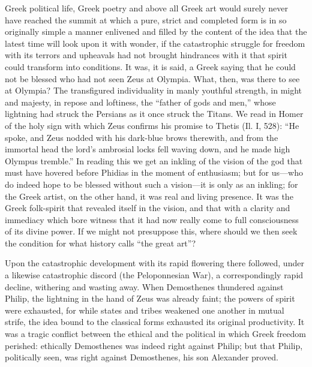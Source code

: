 \documentclass[12pt]{book}
\newcommand{\opage}[1]{\marginnote{\footnotesize\textit{[#1]}}}
\begin{document}
Greek political life, Greek poetry and above all Greek art would surely
never have reached the summit at which a pure, strict and completed form
is in so originally simple a manner enlivened and filled by the content
of the idea that the latest time will look upon it with wonder, if the
catastrophic struggle for freedom with its terrors and upheavals had not
brought hindrances with it that spirit could transform into conditions.
It was, it is said, a Greek saying that he could not be blessed who had
not seen Zeus at Olympia. What, then, was there to see at Olympia? The
transfigured individuality in manly youthful strength, in might and
majesty, in repose and loftiness, the ``father of gods and men,'' whose
lightning had struck the Persians as it once struck the Titans. We read
in Homer of the holy sign with which Zeus confirms his promise to Thetis
(Il. I, 528): ``He spoke, and Zeus nodded with his dark-blue brows
therewith, and from the immortal head the lord's ambrosial locks fell
waving down, and he made high Olympus tremble.'' In reading this we get
an inkling of the vision of the god that must have hovered before
Phidias in the moment of enthusiasm; but for us---who do indeed hope to
be blessed without such a vision---it is only as an inkling; for the
Greek artist, on the other hand, it was real and living presence. It was
the Greek folk-spirit that revealed itself in the vision, and that with
a clarity and immediacy which bore witness that it had now really come
to full consciousness of its divine power. If we might not presuppose
this, where
\opage{27}\setcounter{footnote}{0}%
should we then seek the condition for what history calls ``the great
art''?

Upon the catastrophic development with its rapid flowering there
followed, under a likewise catastrophic discord (the Peloponnesian War),
a correspondingly rapid decline, withering and wasting away. When
Demosthenes thundered against Philip, the lightning in the hand of Zeus
was already faint; the powers of spirit were exhausted, for while states
and tribes weakened one another in mutual strife, the idea bound to the
classical forms exhausted its original productivity. It was a tragic
conflict between the ethical and the political in which Greek freedom
perished: ethically Demosthenes was indeed right against Philip; but
that Philip, politically seen, was right against Demosthenes, his son
Alexander proved.
\end{document}
